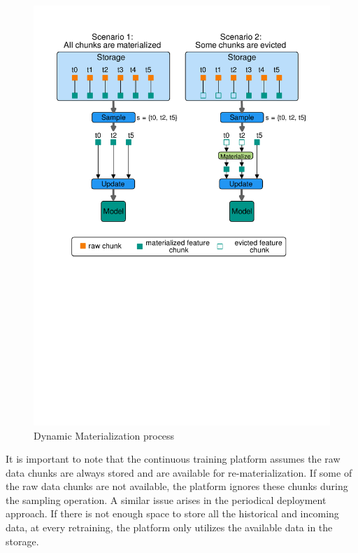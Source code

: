 \begin{figure}[h]
\centering
\includegraphics[width=\columnwidth]{../images/dynamic-materialization.pdf}
\caption{Dynamic Materialization process}
\label{fig:dynamic-materialization-process}
\end{figure}
It is important to note that the continuous training platform assumes the raw data chunks are always stored and are available for re-materialization.
If some of the raw data chunks are not available, the platform ignores these chunks during the sampling operation.
A similar issue arises in the periodical deployment approach.
If there is not enough space to store all the historical and incoming data, at every retraining, the platform only utilizes the available data in the storage.

